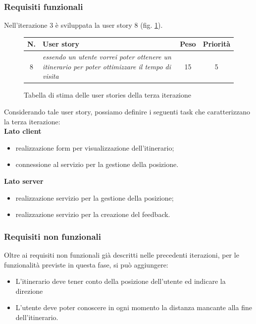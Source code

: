 \subsubsection{Requisiti funzionali}
Nell'iterazione 3 è sviluppata la user story 8 (fig. \ref{userstoriestableterzaiterazione}). 
\begin{figure}[h!]
\begin{center}
\begin{tabular}[c]{|c|p{10cm}|c|c|}
\hline
N. & User story & Peso & Priorità\\
\hline
8 & \textit{essendo un utente vorrei poter ottenere un itinerario per poter ottimizzare il tempo di visita} & 15 & 5\\
\hline
\end{tabular}
\caption{Tabella di stima delle user stories della terza iterazione\label{userstoriestableterzaiterazione}}
\end{center}
\end{figure}

Considerando tale user story, possiamo definire i seguenti task che caratterizzano la terza iterazione:\\
\textbf{Lato client}
\begin{itemize}
\item realizzazione form per visualizzazione dell'itinerario;
\item connessione al servizio per la gestione della posizione.
\end{itemize}

\textbf{Lato server}
\begin{itemize}
\item realizzazione servizio per la gestione della posizione;
\item realizzazione servizio per la creazione del feedback.
\end{itemize}

\subsubsection{Requisiti non funzionali}
Oltre ai requisiti non funzionali già descritti nelle precedenti iterazioni, per le funzionalità previste in questa fase, si può aggiungere:
\begin{itemize}
\item L'itinerario deve tener conto della posizione dell'utente ed indicare la direzione
\item L'utente deve poter conoscere in ogni momento la distanza mancante alla fine dell'itinerario.
\end{itemize}

